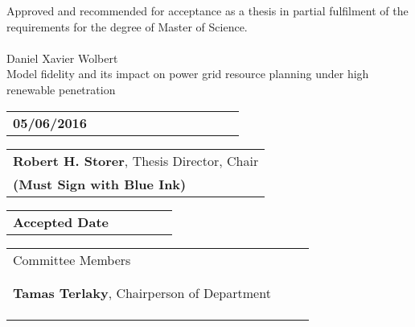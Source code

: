 
\thispagestyle{plain}

Approved and recommended for acceptance as a thesis in partial fulfilment of the requirements for the degree of Master of Science.
\\
\\
Daniel Xavier Wolbert \\
Model fidelity and its impact on power grid resource planning under high renewable penetration

\vspace{.1in}

\begin{tabular}{l}
\\
\hline
\textbf{05/06/2016 \ \ \ \ \ \ \ \ \ \ \ \ \ \ \ \ \ \ \ }
\end{tabular}

\begin{flushright}
\begin{tabular}{l}
\\
\hline
\textbf{Robert H. Storer}, Thesis Director, Chair \\ 
\textbf{(Must Sign with Blue Ink)}
\end{tabular}

\vspace{.05in}

\end{flushright}

\begin{tabular}{l}
\\
\hline
\textbf{Accepted Date \ \ \ \ \ \ \ }
\end{tabular}


\begin{flushright}
\begin{tabular}{l}
Committee Members \ \ \ \ \ \ \ \ \ \ \ \ \ \ \ \ \ \ \ \ \ \ \ \ \ \
\\ 
\\
\\
\hline
\textbf{Tamas Terlaky}, Chairperson of Department\\
\\ 
\\
\\

\end{tabular}
\end{flushright}
\newpage